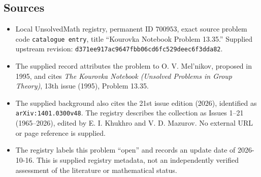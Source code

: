 \documentclass[11pt]{article}
\begin{document}
\subsection{Sources}
\begin{itemize}
\item Local UnsolvedMath registry, permanent ID \(700953\), exact source problem code \texttt{catalogue entry}, title ``Kourovka Notebook Problem 13.35.'' Supplied upstream revision: \texttt{d371ee917ac9647fbb06cd6fc529deec6f3dda82}.
\item The supplied record attributes the problem to O. V. Mel'nikov, proposed in 1995, and cites \emph{The Kourovka Notebook (Unsolved Problems in Group Theory)}, 13th issue (1995), Problem 13.35.
\item The supplied background also cites the 21st issue edition (2026), identified as \texttt{arXiv:1401.0300v48}. The registry describes the collection as Issues 1--21 (1965--2026), edited by E. I. Khukhro and V. D. Mazurov. No external URL or page reference is supplied.
\item The registry labels this problem ``open'' and records an update date of 2026-10-16. This is supplied registry metadata, not an independently verified assessment of the literature or mathematical status.
\end{itemize}
\end{document}
